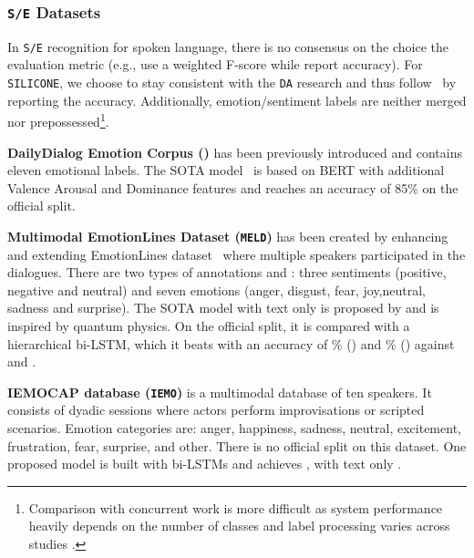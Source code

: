\documentclass[11pt,a4paper]{article}
\begin{document}
\subsubsection{\texttt{S/E} Datasets}
In \texttt{S/E} recognition for spoken language, there is no consensus on the choice the evaluation metric (e.g., \citet{weighted_preproc,weighted_no} use a weighted F-score while \citet{accuracy_fscore} report accuracy). For \texttt{SILICONE}, we choose to stay consistent with the \texttt{DA} research and thus follow~\citet{accuracy_fscore} by reporting the accuracy. Additionally, emotion/sentiment labels are neither merged nor prepossessed\footnote{Comparison with concurrent work is more difficult as system performance heavily depends on the number of classes and label processing varies across studies \cite{variability}.}.


\noindent\textbf{DailyDialog Emotion Corpus ()} has been previously introduced and contains eleven emotional labels. The SOTA model~\cite{de2019joint} is based on BERT with additional Valence Arousal and Dominance features and reaches an accuracy of 85\% on the official split.

\noindent\textbf{Multimodal EmotionLines Dataset (\texttt{MELD})} has been created by enhancing and extending EmotionLines dataset~\cite{emotion_lines} where multiple speakers participated in the dialogues. There are two types of annotations  and  : three sentiments (positive, negative and neutral) and seven emotions (anger, disgust, fear, joy,neutral, sadness and surprise). The SOTA model with text only is proposed by \citet{accuracy_fscore} and is inspired by quantum physics. On the official split, it is compared with a hierarchical bi-LSTM, which it beats with an accuracy of \% () and \% () against  and .

\noindent\textbf{IEMOCAP database (\texttt{IEMO})} is a multimodal database of ten speakers. It consists of dyadic sessions where actors perform improvisations or scripted scenarios. Emotion categories are: anger, happiness, sadness, neutral, excitement, frustration, fear, surprise, and other. There is no official split on this dataset. One proposed model is built with bi-LSTMs and achieves , with text only \cite{accuracy_fscore}.
\end{document}
